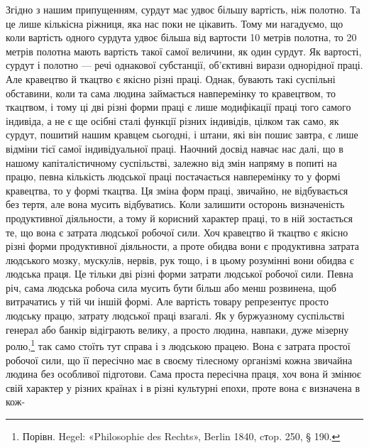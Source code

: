 Згідно з нашим припущенням, сурдут має удвоє більшу вартість,
ніж полотно. Та це лише кількісна ріжниця, яка нас поки
не цікавить. Тому ми нагадуємо, що коли вартість одного
сурдута удвоє більша від вартости 10 метрів полотна, то 20 метрів
полотна мають вартість такої самої величини, як один сурдут. Як
вартості, сурдут і полотно — речі однакової субстанції, об’єктивні
вирази однорідної праці. Але кравецтво й ткацтво є якісно
різні праці. Однак, бувають такі суспільні обставини, коли та
сама людина займається навперемінку то кравецтвом, то ткацтвом,
і тому ці дві різні форми праці є лише модифікації праці
того самого індивіда, а не є ще осібні сталі функції різних індивідів,
цілком так само, як сурдут, пошитий нашим кравцем сьогодні,
і штани, які він пошиє завтра, є лише відміни тієї самої
індивідуальної праці. Наочний досвід навчає нас далі, що в нашому
капіталістичному суспільстві, залежно від змін напряму
в попиті на працю, певна кількість людської праці постачається
навперемінку то у формі кравецтва, то у формі ткацтва. Ця зміна
форм праці, звичайно, не відбувається без тертя, але вона мусить
відбуватись. Коли залишити осторонь визначеність продуктивної
діяльности, а тому й корисний характер праці, то в ній зостається
те, що вона є затрата людської робочої сили. Хоч кравецтво й
ткацтво є якісно різні форми продуктивної діяльности, а проте
обидва вони є продуктивна затрата людського мозку, мускулів,
нервів, рук тощо, і в цьому розумінні вони обидва є людська праця.
Це тільки дві різні форми затрати людської робочої сили. Певна
річ, сама людська робоча сила мусить бути більш або менш розвинена,
щоб витрачатись у тій чи іншій формі. Але вартість товару
репрезентує просто людську працю, затрату людської праці
взагалі. Як у буржуазному суспільстві генерал або банкір відіграють
велику, а просто людина, навпаки, дуже мізерну ролю,\footnote{
Порівн. Hegel: «Philosophie des Rechts», Berlin 1840, cтop. 250,
§ 190.
}
так само стоїть тут справа і з людською працею. Вона є затрата
простої робочої сили, що її пересічно має в своєму тілесному
організмі кожна звичайна людина без особливої підготови. Сама
проста пересічна праця, хоч вона й змінює свій характер у різних
країнах і в різні культурні епохи, проте вона є визначена в кож-

